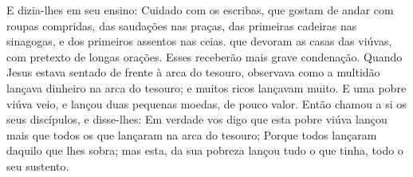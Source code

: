 {  E dizia-lhes em seu ensino: Cuidado com os escribas, que gostam de andar com roupas compridas, das saudações nas praças,
  das primeiras cadeiras nas sinagogas, e dos primeiros assentos nas ceias.
  que devoram as casas das viúvas, com pretexto de longas orações. Esses receberão mais grave condenação.
  Quando Jesus estava sentado de frente à arca do tesouro, observava como a multidão lançava dinheiro na arca do tesouro; e muitos ricos lançavam muito.
  E uma pobre viúva veio, e lançou duas pequenas moedas, de pouco valor.
  Então
{} chamou a si os seus discípulos, e disse-lhes: Em verdade vos digo que esta pobre viúva lançou mais que todos os que lançaram na arca do tesouro;
  Porque todos lançaram daquilo que lhes sobra; mas esta, da sua pobreza lançou tudo o que tinha, todo o seu sustento.
\par }

